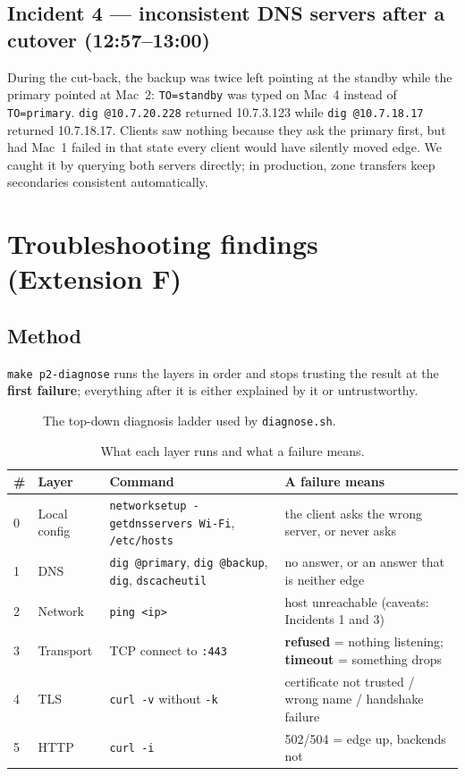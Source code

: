 \documentclass[11pt,a4paper]{article}
\begin{document}
\subsection{Incident 4 --- inconsistent DNS servers after a cutover (12:57--13:00)}
During the cut-back, the backup was twice left pointing at the standby while the primary pointed
at Mac~2: \texttt{TO=standby} was typed on Mac~4 instead of \texttt{TO=primary}.
\texttt{dig @10.7.20.228} returned 10.7.3.123 while \texttt{dig @10.7.18.17} returned 10.7.18.17.
Clients saw nothing because they ask the primary first, but had Mac~1 failed in that state every
client would have silently moved edge. We caught it by querying both servers directly; in
production, zone transfers keep secondaries consistent automatically.

\section{Troubleshooting findings (Extension F)}

\subsection{Method}
\texttt{make p2-diagnose} runs the layers in order and stops trusting the result at the
\textbf{first failure}; everything after it is either explained by it or untrustworthy.

\begin{figure}[!htbp]
\centering
\resizebox{0.96\textwidth}{!}{\drawDiagnose}
\caption{The top-down diagnosis ladder used by \texttt{diagnose.sh}.}
\end{figure}

\begin{table}[!htbp]
\centering
\caption{What each layer runs and what a failure means.}
{\small
\begin{tabular}{@{}L{0.4cm}L{2.0cm}L{6.0cm}L{5.8cm}@{}}
\toprule
\textbf{\#} & \textbf{Layer} & \textbf{Command} & \textbf{A failure means} \\
 & Local config & \texttt{networksetup -getdnsservers Wi-Fi}, \texttt{/etc/hosts} & the client asks the wrong server, or never asks \\
1 & DNS & \texttt{dig @primary}, \texttt{dig @backup}, \texttt{dig}, \texttt{dscacheutil} & no answer, or an answer that is neither edge \\
2 & Network & \texttt{ping <ip>} & host unreachable (caveats: Incidents 1 and 3) \\
3 & Transport & TCP connect to \texttt{:443} & \textbf{refused} = nothing listening; \textbf{timeout} = something drops \\
4 & TLS & \texttt{curl -v} without \texttt{-k} & certificate not trusted / wrong name / handshake failure \\
5 & HTTP & \texttt{curl -i} & 502/504 = edge up, backends not \\
\bottomrule
\end{tabular}}
\end{table}
\end{document}
